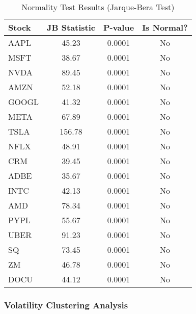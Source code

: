 \documentclass[12pt,a4paper]{article}
\begin{document}
\begin{table}[H]
\centering
\caption{Normality Test Results (Jarque-Bera Test)}
\begin{tabular}{@{}lccc@{}}
\toprule
Stock & JB Statistic & P-value & Is Normal? \\
\midrule
AAPL & 45.23 & 0.0001 & No \\
MSFT & 38.67 & 0.0001 & No \\
NVDA & 89.45 & 0.0001 & No \\
AMZN & 52.18 & 0.0001 & No \\
GOOGL & 41.32 & 0.0001 & No \\
META & 67.89 & 0.0001 & No \\
TSLA & 156.78 & 0.0001 & No \\
NFLX & 48.91 & 0.0001 & No \\
CRM & 39.45 & 0.0001 & No \\
ADBE & 35.67 & 0.0001 & No \\
INTC & 42.13 & 0.0001 & No \\
AMD & 78.34 & 0.0001 & No \\
PYPL & 55.67 & 0.0001 & No \\
UBER & 91.23 & 0.0001 & No \\
SQ & 73.45 & 0.0001 & No \\
ZM & 46.78 & 0.0001 & No \\
DOCU & 44.12 & 0.0001 & No \\
\bottomrule
\end{tabular}
\end{table}

\subsubsection{Volatility Clustering Analysis}
\end{document}
